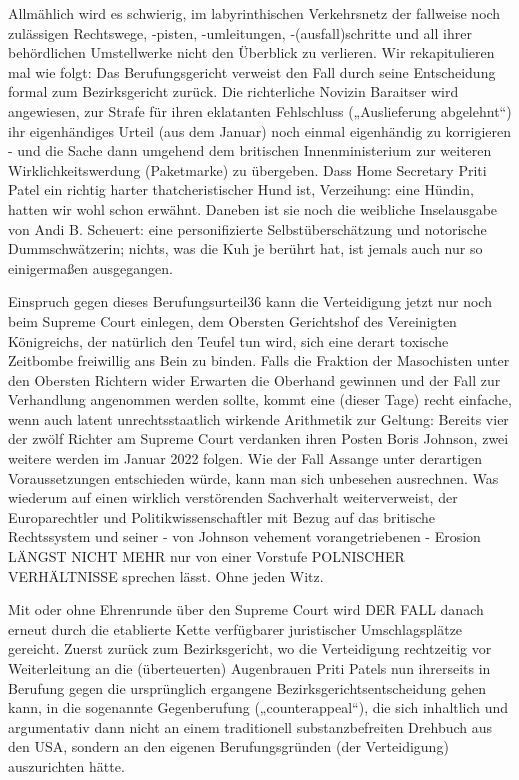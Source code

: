 \begin{multicols}{2}
Allmählich wird es schwierig, im labyrinthischen Verkehrsnetz der fallweise noch zulässigen Rechtswege,
-pisten, -umleitungen, -(ausfall)schritte und all ihrer behördlichen Umstellwerke nicht den Überblick zu verlieren. Wir rekapitulieren mal wie folgt: Das Berufungsgericht verweist den Fall durch seine Entscheidung formal
zum Bezirksgericht zurück. Die richterliche Novizin Baraitser wird angewiesen, zur Strafe für ihren eklatanten
Fehlschluss („Auslieferung abgelehnt“) ihr eigenhändiges Urteil (aus dem Januar) noch einmal eigenhändig zu
korrigieren - und die Sache dann umgehend dem britischen Innenministerium zur weiteren Wirklichkeitswerdung (Paketmarke) zu übergeben. Dass Home Secretary
Priti Patel ein richtig harter thatcheristischer Hund ist,
Verzeihung: eine Hündin, hatten wir wohl schon erwähnt. Daneben ist sie noch die weibliche Inselausgabe
von Andi B. Scheuert: eine personifizierte Selbstüberschätzung und notorische Dummschwätzerin; nichts,
was die Kuh je berührt hat, ist jemals auch nur so einigermaßen ausgegangen.

Einspruch gegen dieses Berufungsurteil36 kann die Verteidigung jetzt nur noch beim Supreme Court einlegen,
dem Obersten Gerichtshof des Vereinigten Königreichs,
der natürlich den Teufel tun wird, sich eine derart toxische Zeitbombe freiwillig ans Bein zu binden. Falls die
Fraktion der Masochisten unter den Obersten Richtern
wider Erwarten die Oberhand gewinnen und der Fall zur
Verhandlung angenommen werden sollte, kommt eine
(dieser Tage) recht einfache, wenn auch latent unrechtsstaatlich wirkende Arithmetik zur Geltung: Bereits vier
der zwölf Richter am Supreme Court verdanken ihren
Posten Boris Johnson, zwei weitere werden im Januar
2022 folgen. Wie der Fall Assange unter derartigen Voraussetzungen entschieden würde, kann man sich unbesehen ausrechnen. Was wiederum auf einen wirklich
verstörenden Sachverhalt weiterverweist, der Europarechtler und Politikwissenschaftler mit Bezug auf das
britische Rechtssystem und seiner - von Johnson vehement vorangetriebenen - Erosion LÄNGST NICHT
MEHR nur von einer Vorstufe POLNISCHER VERHÄLTNISSE sprechen lässt. Ohne jeden Witz.

Mit oder ohne Ehrenrunde über den Supreme Court wird
DER FALL danach erneut durch die etablierte Kette verfügbarer juristischer Umschlagsplätze gereicht. Zuerst
zurück zum Bezirksgericht, wo die Verteidigung rechtzeitig vor Weiterleitung an die (überteuerten) Augenbrauen Priti Patels nun ihrerseits in Berufung gegen die %
ursprünglich ergangene Bezirksgerichtsentscheidung
gehen kann, in die sogenannte Gegenberufung („counterappeal“), die sich inhaltlich und argumentativ dann
nicht an einem traditionell substanzbefreiten Drehbuch
aus den USA, sondern an den eigenen Berufungsgründen (der Verteidigung) auszurichten hätte.


\end{multicols}
